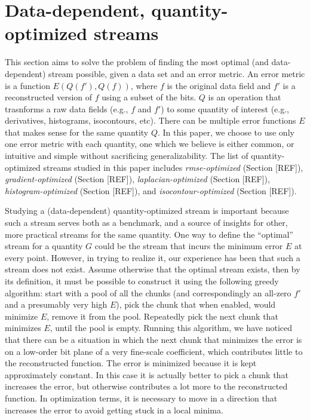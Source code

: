\section{Data-dependent, quantity-optimized streams}
\label{sec:data_dep_streams}

This section aims to solve the problem of finding the most optimal (and data-dependent) stream
possible, given a data set and an error metric. An error metric is a function $E(Q(f'),Q(f))$, where
$f$ is the original data field and $f'$ is a reconstructed version of $f$ using a subset of the
bits. $Q$ is an operation that trasnforms a raw data fields (e.g., $f$ and $f'$) to some quantity of
interest (e.g., derivatives, histograms, isocontours, etc). There can be multiple error functions
$E$ that makes sense for the same quantity $Q$. In this paper, we choose to use only one error
metric with each quantity, one which we believe is either common, or intuitive and simple without
sacrificing generalizability. The list of quantity-optimized streams studied in this paper includes
\emph{rmse-optimized} (Section [REF]), \emph{gradient-optimized} (Section [REF]),
\emph{laplacian-optimized} (Section [REF]), \emph{histogram-optimized} (Section [REF]), and
\emph{isocontour-optimized} (Section [REF]).

Studying a (data-dependent) quantity-optimized stream is important because such a stream serves both
as a benchmark, and a source of insights for other, more practical streams for the same quantity.
One way to define the ``optimal'' stream for a quantity $G$ could be the stream that incurs the
minimum error $E$ at every point. However, in trying to realize it, our experience has been that
such a stream does not exist. Assume otherwise that the optimal stream exists, then by its
definition, it must be possible to construct it using the following greedy algorithm: start with a
pool of all the chunks (and correspondingly an all-zero $f'$ and a presumably very high $E$), pick
the chunk that when enabled, would minimize $E$, remove it from the pool. Repeatedly pick the next
chunk that minimizes $E$, until the pool is empty. Running this algorithm, we have noticed that
there can be a situation in which the next chunk that minimizes the error is on a low-order bit
plane of a very fine-scale coefficient, which contributes little to the reconstructed function. The
error is minimized because it is kept approximately constant. In this case it is actually better to
pick a chunk that increases the error, but otherwise contributes a lot more to the reconstructed
function. In optimization terms, it is necessary to move in a direction that increases the error to
avoid getting stuck in a local minima.

